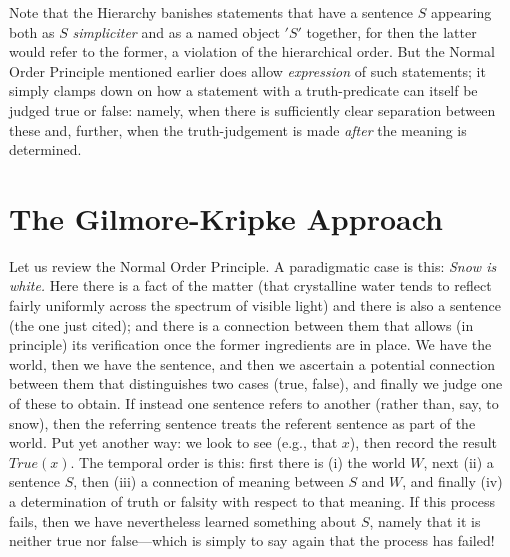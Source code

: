 \documentclass{amsart}
\begin{document}
Note that the Hierarchy banishes statements that have a sentence $S$
appearing both as $S$ {\em simpliciter} and as a named object $'S'$
together, for then the latter would refer to the former, a violation
of the hierarchical order. But the Normal Order Principle mentioned
earlier does allow {\em expression} of such statements; it simply clamps down
on how a statement with a truth-predicate can itself be judged true or
false: namely, when there is sufficiently clear separation between these and,
further, when the truth-judgement is made {\em after} the meaning is
determined.

\section{The Gilmore-Kripke Approach}

Let us review the Normal Order Principle.  A paradigmatic case is
this: {\em Snow is white.} Here there is a fact of the matter (that
crystalline water tends to reflect fairly uniformly across the
spectrum of visible light) and there is also a sentence (the one just
cited); and there is a connection between them that allows (in
principle) its verification once the former ingredients are in place.
We have the world, then we have the sentence, and then we ascertain a
potential connection between them that distinguishes two cases (true,
false), and finally we judge one of these to obtain.  If instead one sentence
refers to another (rather than, say, to snow), then the referring
sentence treats the referent sentence as part of the world.   Put yet
another way: we look to see (e.g., that $x$), then record the result
$True(x)$.  The temporal order is this: first there is (i) the world $W$, next (ii) a
sentence $S$, then (iii) a connection of meaning between $S$ and $W$, and
finally (iv) a determination of truth or falsity with respect to that
meaning. If this process fails, then we have nevertheless learned
something about $S$, namely that it is neither true nor false---which
is simply to say again that the process has failed!  
\end{document}
